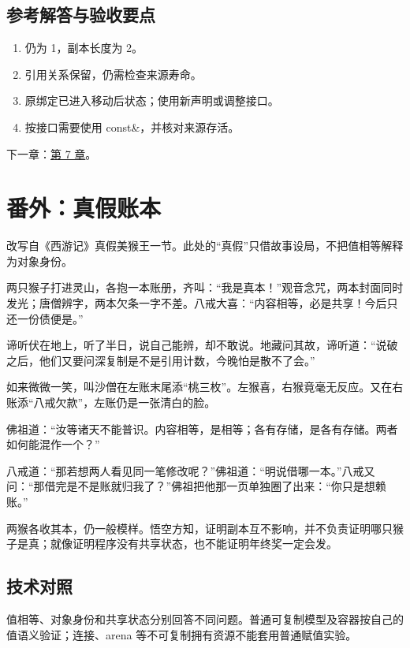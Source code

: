 \subsection*{参考解答与验收要点}

\begin{enumerate}

\item 仍为 1，副本长度为 2。

\item 引用关系保留，仍需检查来源寿命。

\item 原绑定已进入移动后状态；使用新声明或调整接口。

\item 按接口需要使用 const\&，并核对来源存活。

\end{enumerate}

下一章：\hyperref[ch:07]{第 7 章}。

\section{番外：真假账本}

改写自《西游记》真假美猴王一节。此处的“真假”只借故事设局，不把值相等解释为对象身份。

两只猴子打进灵山，各抱一本账册，齐叫：“我是真本！”观音念咒，两本封面同时发光；唐僧辨字，两本欠条一字不差。八戒大喜：“内容相等，必是共享！今后只还一份债便是。”

谛听伏在地上，听了半日，说自己能辨，却不敢说。地藏问其故，谛听道：“说破之后，他们又要问深复制是不是引用计数，今晚怕是散不了会。”

如来微微一笑，叫沙僧在左账末尾添“桃三枚”。左猴喜，右猴竟毫无反应。又在右账添“八戒欠款”，左账仍是一张清白的脸。

佛祖道：“汝等诸天不能普识。内容相等，是相等；各有存储，是各有存储。两者如何能混作一个？”

八戒道：“那若想两人看见同一笔修改呢？”佛祖道：“明说借哪一本。”八戒又问：“那借完是不是账就归我了？”佛祖把他那一页单独圈了出来：“你只是想赖账。”

两猴各收其本，仍一般模样。悟空方知，证明副本互不影响，并不负责证明哪只猴子是真；就像证明程序没有共享状态，也不能证明年终奖一定会发。

\subsection*{技术对照}

值相等、对象身份和共享状态分别回答不同问题。普通可复制模型及容器按自己的值语义验证；连接、arena 等不可复制拥有资源不能套用普通赋值实验。
